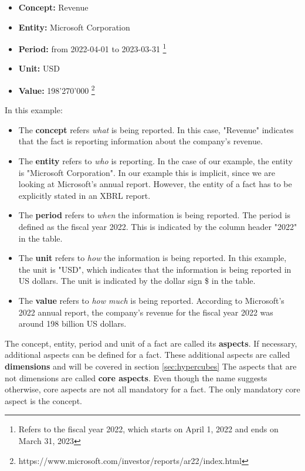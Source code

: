 \begin{itemize}
    \item \textbf{Concept:} Revenue
    \item \textbf{Entity:} Microsoft Corporation
    \item \textbf{Period:} from 2022-04-01 to 2023-03-31 \footnote[0]{Refers to the fiscal year 2022, which starts on April 1, 2022 and ends on March 31, 2023}
    \item \textbf{Unit:} USD
    \item \textbf{Value:} 198'270'000 \footnote[1]{https://www.microsoft.com/investor/reports/ar22/index.html}
\end{itemize}

In this example:

\begin{itemize}
    \item The \textbf{concept} refers \textit{what} is being reported. 
    In this case, "Revenue" indicates that the fact is reporting information about the company's revenue.
    \item The \textbf{entity} refers to \textit{who} is reporting. 
    In the case of our example, the entity is "Microsoft Corporation". 
    In our example this is implicit, since we are looking at Microsoft's annual report.
    However, the entity of a fact has to be explicitly stated in an XBRL report.
    \item The \textbf{period} refers to \textit{when} the information is being reported.
    The period is defined as the fiscal year 2022.
    This is indicated by the column header "2022" in the table.
    \item The \textbf{unit} refers to \textit{how} the information is being reported.
    In this example, the unit is "USD", which indicates that the information is being reported in US dollars.
    The unit is indicated by the dollar sign \$ in the table.
    \item The \textbf{value} refers to \textit{how much} is being reported.
    According to Microsoft's 2022 annual report, the company's revenue for the fiscal year 2022 was around 198 billion US dollars.
\end{itemize}

The concept, entity, period and unit of a fact are called its \textbf{aspects}. 
If necessary, additional aspects can be defined for a fact. 
These additional aspects are called \textbf{dimensions} and will be covered in section \ref{sec:hypercubes}
The aspects that are not dimensions are called \textbf{core aspects}. 
Even though the name suggests otherwise, core aspects are not all mandatory for a fact.
The only mandatory core aspect is the concept.